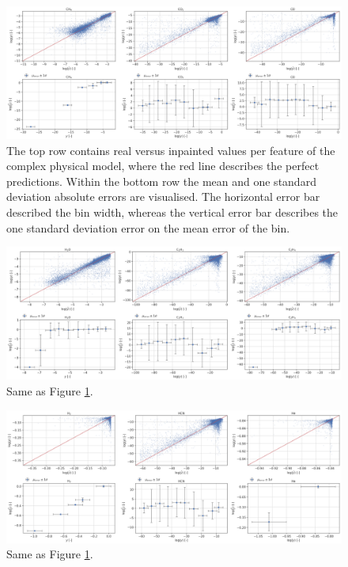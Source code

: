 \begin{figure} [!htb]
    \centering
    \includegraphics[width=\textwidth,keepaspectratio]{figuren/results1.png}
    \caption{The top row contains real versus inpainted values per feature of the complex physical model, where the red line describes the perfect predictions. Within the bottom row the mean and one standard deviation absolute errors are visualised. The horizontal error bar described the bin width, whereas the vertical error bar describes the one standard deviation error on the mean error of the bin. }
    \label{fig:complex_results_1}
\end{figure}

\begin{figure} [!htb]
    \centering
    \includegraphics[width=\textwidth,keepaspectratio]{figuren/results2.png}
    \caption{Same as Figure \ref{fig:complex_results_1}.}
    \label{fig:complex_results_2}
\end{figure}

\begin{figure} [!htb]
    \centering
    \includegraphics[width=\textwidth,keepaspectratio]{figuren/results3.png}
    \caption{Same as Figure \ref{fig:complex_results_1}.}
    \label{fig:complex_results_3}
\end{figure}

